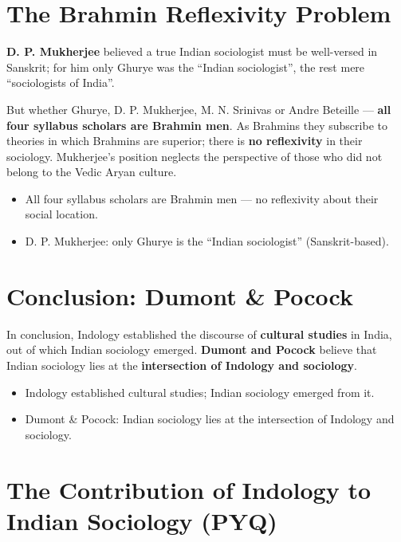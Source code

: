 \section{The Brahmin Reflexivity Problem}

\textbf{D. P. Mukherjee} believed a true Indian sociologist must be well-versed in Sanskrit; for him only Ghurye was the ``Indian sociologist'', the rest mere ``sociologists of India''.

\begin{CriticalPoint}
But whether Ghurye, D. P. Mukherjee, M. N. Srinivas or Andre Beteille --- \textbf{all four syllabus scholars are Brahmin men}. As Brahmins they subscribe to theories in which Brahmins are superior; there is \textbf{no reflexivity} in their sociology. Mukherjee's position neglects the perspective of those who did not belong to the Vedic Aryan culture.
\end{CriticalPoint}

\begin{QuickRevision}
\begin{itemize}
\item All four syllabus scholars are Brahmin men --- no reflexivity about their social location.
\item D. P. Mukherjee: only Ghurye is the ``Indian sociologist'' (Sanskrit-based).
\end{itemize}
\end{QuickRevision}

\section{Conclusion: Dumont \& Pocock}

In conclusion, Indology established the discourse of \textbf{cultural studies} in India, out of which Indian sociology emerged. \textbf{Dumont and Pocock} believe that Indian sociology lies at the \textbf{intersection of Indology and sociology}.

\begin{QuickRevision}
\begin{itemize}
\item Indology established cultural studies; Indian sociology emerged from it.
\item Dumont \& Pocock: Indian sociology lies at the intersection of Indology and sociology.
\end{itemize}
\end{QuickRevision}

\section{The Contribution of Indology to Indian Sociology (PYQ)}

